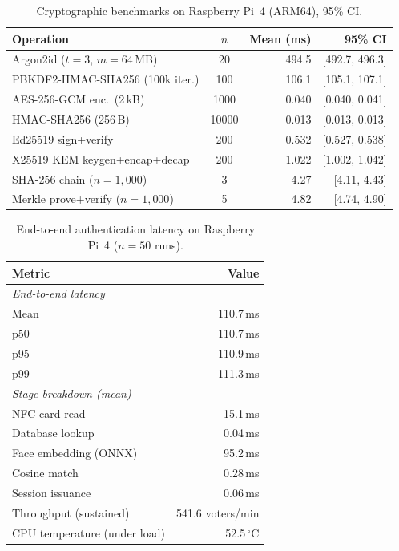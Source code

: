 \documentclass[a4paper,12pt]{article}
\newcommand{\botrule}{\bottomrule}
\begin{document}
\bigskip

\begin{table}[htbp]
\caption{Cryptographic benchmarks on Raspberry Pi~4 (ARM64), 95\% CI.}
\label{tab:crypto}
\begin{tabular}{lcrr}
  \toprule
  \textbf{Operation} & $n$ & \textbf{Mean (ms)} & \textbf{95\% CI} \\
  \midrule
  Argon2id ($t{=}3$, $m{=}64$\,MB) & 20    & 494.5 & [492.7, 496.3] \\
  PBKDF2-HMAC-SHA256 (100k iter.)   & 100   & 106.1 & [105.1, 107.1] \\
  AES-256-GCM enc.\ (2\,kB)         & 1000  & 0.040 & [0.040, 0.041] \\
  HMAC-SHA256 (256\,B)              & 10000 & 0.013 & [0.013, 0.013] \\
  Ed25519 sign+verify               & 200   & 0.532 & [0.527, 0.538] \\
  X25519 KEM keygen+encap+decap     & 200   & 1.022 & [1.002, 1.042] \\
  SHA-256 chain ($n{=}1{,}000$)     & 3     & 4.27  & [4.11, 4.43]   \\
  Merkle prove+verify ($n{=}1{,}000$) & 5   & 4.82  & [4.74, 4.90]   \\
  \botrule
\end{tabular}
\end{table}

\bigskip

\begin{table}[htbp]
\caption{End-to-end authentication latency on Raspberry Pi~4
  ($n{=}50$ runs).}
\label{tab:pi}
\begin{tabular}{lr}
  \toprule
  \textbf{Metric} & \textbf{Value} \\
  \midrule
  \multicolumn{2}{l}{\textit{End-to-end latency}} \\
  \quad Mean                   & 110.7\,ms \\
  \quad p50                    & 110.7\,ms \\
  \quad p95                    & 110.9\,ms \\
  \quad p99                    & 111.3\,ms \\
  \midrule
  \multicolumn{2}{l}{\textit{Stage breakdown (mean)}} \\
  \quad NFC card read          & 15.1\,ms  \\
  \quad Database lookup        & 0.04\,ms  \\
  \quad Face embedding (ONNX)  & 95.2\,ms  \\
  \quad Cosine match           & 0.28\,ms  \\
  \quad Session issuance       & 0.06\,ms  \\
  \midrule
  Throughput (sustained)       & 541.6 voters/min \\
  CPU temperature (under load) & 52.5\,$^\circ$C  \\
  \botrule
\end{tabular}
\end{table}
\end{document}
